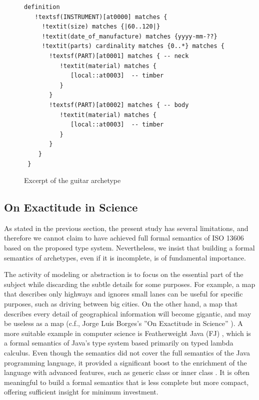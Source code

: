 \documentclass[preprint,3p,onecolumn,times,review]{article}
\begin{document}
{\begin{figure}[!htbp]
\begin{minipage}{1.0\linewidth}
\begin{Verbatim}[frame=single,fontsize=\small, commandchars=!\(\)]
 definition
   !textsf(INSTRUMENT)[at0000] matches {
     !textit(size) matches {|60..120|}
     !textit(date_of_manufacture) matches {yyyy-mm-??}
     !textit(parts) cardinality matches {0..*} matches {
       !textsf(PART)[at0001] matches { -- neck
          !textit(material) matches {
             [local::at0003]  -- timber
          }
       }
       !textsf(PART)[at0002] matches { -- body
          !textit(material) matches {
             [local::at0003]  -- timber
          }
       }
    }
 }
\end{Verbatim}
\end{minipage}
\caption{Excerpt of the guitar archetype \cite[xvi]{iso08:13606_healt_elect_part2}}\label{fig:guitar_example}
\end{figure}
  

\subsection{On Exactitude in Science}

As stated in the previous section, the present study has several limitations, and therefore we cannot claim to have achieved full formal semantics of ISO 13606 based on the proposed type system.
Nevertheless, we insist that building a formal semantics of archetypes, even if it is incomplete, is of fundamental importance.

The activity of modeling or abstraction is to focus on the essential part of the subject while discarding the subtle details for some purposes. 
For example, a map that describes only highways and ignores small lanes can be useful for specific purposes, such as driving between big cities.
On the other hand, a map that describes every detail of geographical information will become gigantic, and may be useless as a map (c.f., Jorge Luis Borges's ''On Exactitude in Science'' \cite{borges99:_collec_jorge_luis_borges}).
A more suitable example in computer science is Featherweight Java (FJ) \cite{igarashi01:_feath_java},
which is a formal semantics of Java's type system based primarily on typed lambda calculus.
Even though the semantics did not cover the full semantics of the Java programming language, it provided a significant boost to the enrichment of the language with advanced features, such as generic class or inner class \cite[p.246]{pierce02:_types_progr_languag}.
It is often meaningful to build a formal semantics that is less complete but more compact, offering sufficient insight for minimum investment.

}
\end{document}
